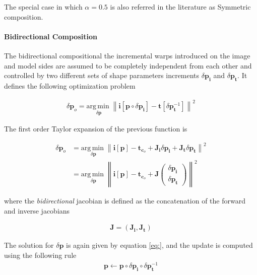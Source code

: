 The special case in which $\alpha = 0.5$ is also referred in the literature as Symmetric composition.

\paragraph{Bidirectional Composition}

The bidirectional compositional the  incremental  warps  introduced  on  the  image and model sides are assumed to be completely independent from each other and controlled by two different sets of shape parameters increments $\delta \mathbf{p}_{\mathbf{i}}$ and $\delta \mathbf{p}_{\mathbf{t}}$. It defines the following optimization problem

\begin{equation}
	\begin{aligned}
		\delta \mathbf{p}_o = \underset{\delta \mathbf{p}}{\mathrm{arg\,min\;}}
		\left\| \mathbf{i}[\mathbf{p} \circ \delta \mathbf{p}_{\mathbf{i}}] - \mathbf{t}[\delta \mathbf{p}_{\mathbf{t}}^{-1}] \right\|^2
	\end{aligned}
\end{equation}

The first order Taylor expansion of the previous function is

\begin{equation}
	\begin{aligned}
		\delta \mathbf{p}_o & = \underset{\delta \mathbf{p}}{\mathrm{arg\,min\;}}
		\left\| \mathbf{i}[\mathbf{p}] - \mathbf{t}_{\mathbf{c}_o} + 
		\mathbf{J}_{\mathbf{i}} \delta \mathbf{p}_{\mathbf{i}} + \mathbf{J}_{\mathbf{t}} \delta \mathbf{p}_{\mathbf{t}} \right\|^2
		\\
		& = \underset{\delta \mathbf{p}}{\mathrm{arg\,min\;}}
		\left\| \mathbf{i}[\mathbf{p}] - \mathbf{t}_{\mathbf{c}_o} + \mathbf{J} 
		\begin{pmatrix}
		\delta \mathbf{p}_{\mathbf{i}}
		\\ 
		\delta \mathbf{p}_{\mathbf{t}}
		\end{pmatrix} \right\|^2
	\end{aligned}
\end{equation}

where the \emph{bidirectional} jacobian is defined as the concatenation of the forward and inverse jacobians

\begin{equation}
	\begin{aligned}
		\mathbf{J} = \left( \mathbf{J}_{\mathbf{i}}, \mathbf{J}_{\mathbf{t}} \right)
	\end{aligned}
\end{equation}

The solution for $\delta \mathbf{p}$ is again given by equation \ref{eq:}, and the update is computed using the following rule
\begin{equation}
	\begin{aligned}
		\mathbf{p} \leftarrow \mathbf{p} \circ \delta \mathbf{p}_{\mathbf{i}} \circ \delta \mathbf{p}_{\mathbf{t}}^{-1} 
	\end{aligned}
\end{equation}
